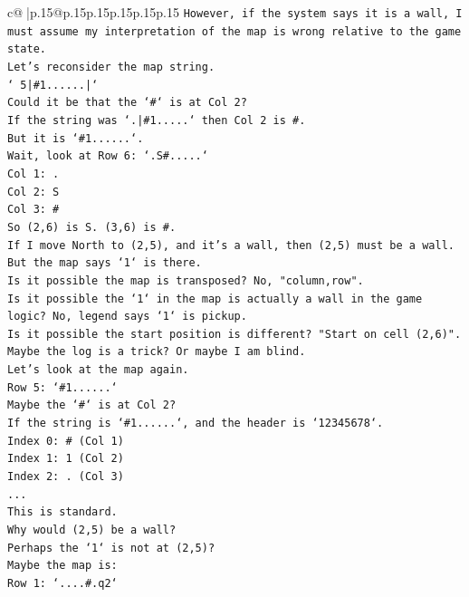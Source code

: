 \documentclass{article}
\begin{document}
{\begin{supertabular}{c@{$\;$}|p{.15\linewidth}@{}p{.15\linewidth}p{.15\linewidth}p{.15\linewidth}p{.15\linewidth}p{.15\linewidth}}
{{{\texttt{However, if the system says it is a wall, I must assume my interpretation of the map is wrong relative to the game state.} \\
\texttt{Let's reconsider the map string.} \\
\texttt{` 5|\#1......|`} \\
\texttt{Could it be that the `\#` is at Col 2?} \\
\texttt{If the string was `.|\#1.....` then Col 2 is \#.} \\
\texttt{But it is `\#1......`.} \\
\texttt{Wait, look at Row 6: `.S\#.....`} \\
\texttt{Col 1: .} \\
\texttt{Col 2: S} \\
\texttt{Col 3: \#} \\
\texttt{So (2,6) is S. (3,6) is \#.} \\
\texttt{If I move North to (2,5), and it's a wall, then (2,5) must be a wall.} \\
\texttt{But the map says `1` is there.} \\
\texttt{Is it possible the map is transposed? No, "column,row".} \\
\texttt{Is it possible the `1` in the map is actually a wall in the game logic? No, legend says `1` is pickup.} \\
\texttt{Is it possible the start position is different? "Start on cell (2,6)".} \\
\texttt{Maybe the log is a trick? Or maybe I am blind.} \\
\texttt{Let's look at the map again.} \\
\texttt{Row 5: `\#1......`} \\
\texttt{Maybe the `\#` is at Col 2?} \\
\texttt{If the string is `\#1......`, and the header is `12345678`.} \\
\texttt{Index 0: \# (Col 1)} \\
\texttt{Index 1: 1 (Col 2)} \\
\texttt{Index 2: . (Col 3)} \\
\texttt{...} \\
\texttt{This is standard.} \\
\texttt{Why would (2,5) be a wall?} \\
\texttt{Perhaps the `1` is not at (2,5)?} \\
\texttt{Maybe the map is:} \\
\texttt{Row 1: `....\#.q2`} \\
}}}
\end{supertabular}}
\end{document}

